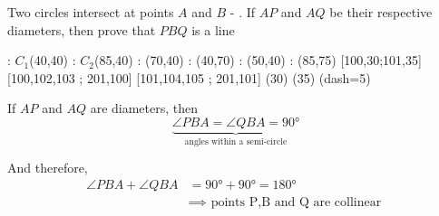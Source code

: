 

\question[2] Two circles intersect at points $A$ and $B$ - \asif. If $AP$ and $AQ$ be their 
respective diameters, then prove that $PBQ$ is a line


  \begin{marginfigure}
    	: $C_1$(40,40)
    	: $C_2$(85,40)
      : (70,40) %
      : (40,70) %
      : (50,40) %
      : (85,75)
       [100,30;101,35] %
       [100,102,103 ; 201,100] %
       [101,104,105 ; 201,101] %
    \figdrawbegin{}
      (30)
      (35)
      \figdrawline [201,301]
      \figdrawline [201,311]
      \figdrawline [301,311]
      \ifprintanswers
        \figset (dash=5)
        \figdrawline [201,200]
      \fi
    \figdrawend
    \centerline{\box\figBoxA}
  \end{marginfigure} 

\begin{solution}[\halfpage]
	If $AP$ and $AQ$ are diameters, then 
  \[ \underbrace{\angle{PBA}=\angle{QBA}=\ang{90}}_{\text{angles within a semi-circle}} \]
	
	And therefore, 
	\begin{align}
		\angle PBA + \angle QBA &= \ang{90} + \ang{90} = \ang{180} \\
		     &\implies \text{ points P,B and Q are collinear }
	\end{align}
\end{solution}


